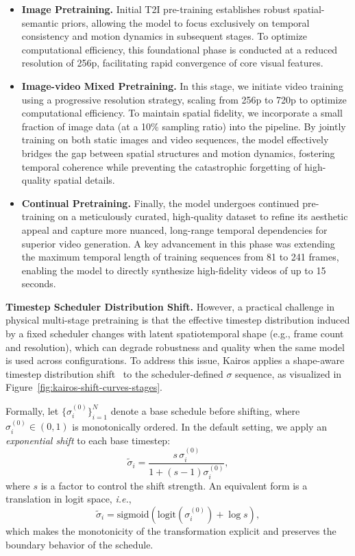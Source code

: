 \begin{itemize}
\item \textbf {Image Pretraining.} 
Initial T2I pre-training establishes robust spatial-semantic priors, allowing the model to focus exclusively on temporal consistency and motion dynamics in subsequent stages. 
To optimize computational efficiency, this foundational phase is conducted at a reduced resolution of 256p, facilitating rapid convergence of core visual features. 


\item \textbf{Image-video Mixed Pretraining.}
In this stage, we initiate video training using a progressive resolution strategy, scaling from 256p to 720p to optimize computational efficiency. To maintain spatial fidelity, we incorporate a small fraction of image data (at a 10\% sampling ratio) into the pipeline. By jointly training on both static images and video sequences, the model effectively bridges the gap between spatial structures and motion dynamics, fostering temporal coherence while preventing the catastrophic forgetting of high-quality spatial details.

\item \textbf {Continual Pretraining.} Finally, the model undergoes continued pre-training on a meticulously curated, high-quality dataset to refine its aesthetic appeal and capture more nuanced, long-range temporal dependencies for superior video generation. A key advancement in this phase was extending the maximum temporal length of training sequences from 81 to 241 frames, enabling the model to directly synthesize high-fidelity videos of up to 15 seconds.
\end{itemize}

\textbf{Timestep Scheduler Distribution Shift.}
However, a practical challenge in physical multi-stage pretraining is that the effective timestep distribution induced by a fixed scheduler changes with latent spatiotemporal shape (e.g., frame count and resolution), which can degrade robustness and quality when the same model is used across configurations.
To address this issue, Kairos applies a shape-aware timestep distribution shift~\cite{sd3,hunyuanvideo,opensora2,wan2025} to the scheduler-defined $\sigma$ sequence, as visualized in Figure~\ref{fig:kairos-shift-curves-stages}.

Formally, let $\{\sigma_i^{(0)}\}_{i=1}^{N}$ denote a base schedule before shifting, where $\sigma_i^{(0)} \in (0,1)$ is monotonically ordered.
In the default setting, we apply an \emph{exponential shift} to each base timestep:
\begin{equation}
\tilde{\sigma}_i
=
\frac{s\,\sigma_i^{(0)}}{1 + (s-1)\sigma_i^{(0)}},
\label{eq:kairos_exp_shift_rational}
\end{equation}
where $s$ is a factor to control the shift strength.
An equivalent form is a translation in logit space, \textit{i.e.},
\begin{equation}
\tilde{\sigma}_i
=
\mathrm{sigmoid}\!\left(\mathrm{logit}\!\left(\sigma_i^{(0)}\right)+\log s\right),
\label{eq:kairos_exp_shift_logit}
\end{equation}
which makes the monotonicity of the transformation explicit and preserves the boundary behavior of the schedule.


